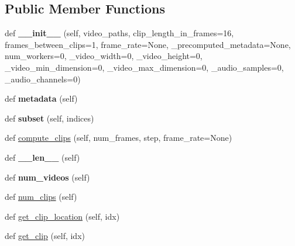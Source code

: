\subsection*{Public Member Functions}
\begin{DoxyCompactItemize}
\item 
\mbox{\label{classtorchvision_1_1datasets_1_1video__utils_1_1VideoClips_ab748894947f4f921f808b369d1ead24d}} 
def {\bfseries \+\_\+\+\_\+init\+\_\+\+\_\+} (self, video\+\_\+paths, clip\+\_\+length\+\_\+in\+\_\+frames=16, frames\+\_\+between\+\_\+clips=1, frame\+\_\+rate=None, \+\_\+precomputed\+\_\+metadata=None, num\+\_\+workers=0, \+\_\+video\+\_\+width=0, \+\_\+video\+\_\+height=0, \+\_\+video\+\_\+min\+\_\+dimension=0, \+\_\+video\+\_\+max\+\_\+dimension=0, \+\_\+audio\+\_\+samples=0, \+\_\+audio\+\_\+channels=0)
\item 
\mbox{\label{classtorchvision_1_1datasets_1_1video__utils_1_1VideoClips_a3ad9919703d3fd7f06384f5a3fc309a1}} 
def {\bfseries metadata} (self)
\item 
\mbox{\label{classtorchvision_1_1datasets_1_1video__utils_1_1VideoClips_ac29555f7f844b9358a8eb165387a6ebd}} 
def {\bfseries subset} (self, indices)
\item 
def \hyperlink{classtorchvision_1_1datasets_1_1video__utils_1_1VideoClips_adf7704fec2eae8c21307af5ef65b56b4}{compute\+\_\+clips} (self, num\+\_\+frames, step, frame\+\_\+rate=None)
\item 
\mbox{\label{classtorchvision_1_1datasets_1_1video__utils_1_1VideoClips_a01198b867e552d08f8e8a78668baaced}} 
def {\bfseries \+\_\+\+\_\+len\+\_\+\+\_\+} (self)
\item 
\mbox{\label{classtorchvision_1_1datasets_1_1video__utils_1_1VideoClips_a38c038b23eab5eabcc9d89256fc62ade}} 
def {\bfseries num\+\_\+videos} (self)
\item 
def \hyperlink{classtorchvision_1_1datasets_1_1video__utils_1_1VideoClips_a278d29cc385ec49a301cb3c59026503b}{num\+\_\+clips} (self)
\item 
def \hyperlink{classtorchvision_1_1datasets_1_1video__utils_1_1VideoClips_a52b367dc6680de516b0e1940c422d5db}{get\+\_\+clip\+\_\+location} (self, idx)
\item 
def \hyperlink{classtorchvision_1_1datasets_1_1video__utils_1_1VideoClips_a1596126a829498b852406c593268568e}{get\+\_\+clip} (self, idx)
\end{DoxyCompactItemize}
